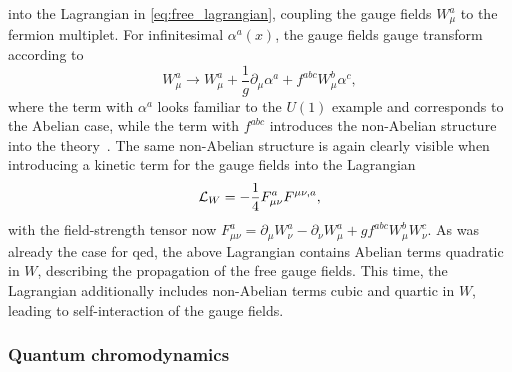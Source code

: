 into the Lagrangian in \cref{eq:free_lagrangian}, coupling the gauge fields $W^a_\mu$ to the fermion multiplet. For infinitesimal $\alpha^a(x)$, the gauge fields gauge transform according to
\begin{equation}
	W_\mu^a \rightarrow W_\mu^a + \frac{1}{g}\partial_\mu\alpha^a + f^{abc} W_\mu^b \alpha^c,
\end{equation}
where the term with $\alpha^a$ looks familiar to the $U(1)$ example and corresponds to the Abelian case, while the term with $f^{abc}$ introduces the non-Abelian structure into the theory~\cite{Brock:1354959}. The same non-Abelian structure is again clearly visible when introducing a kinetic term for the gauge fields into the Lagrangian
\begin{equation}
	\mathcal{L}_{W} = -\frac{1}{4} F^a_{\mu\nu} F^{\mu\nu,a},
\end{equation} 
with the field-strength tensor now $F^a_{\mu\nu} = \partial_\mu W^a_\nu - \partial_\nu W^a_\mu + gf^{abc}W^b_\mu W^c_\nu$. As was already the case for \gls{qed}, the above Lagrangian contains Abelian terms quadratic in $W$, describing the propagation of the free gauge fields. This time, the Lagrangian additionally includes non-Abelian terms cubic and quartic in $W$, leading to self-interaction of the gauge fields.

\subsubsection{Quantum chromodynamics}

